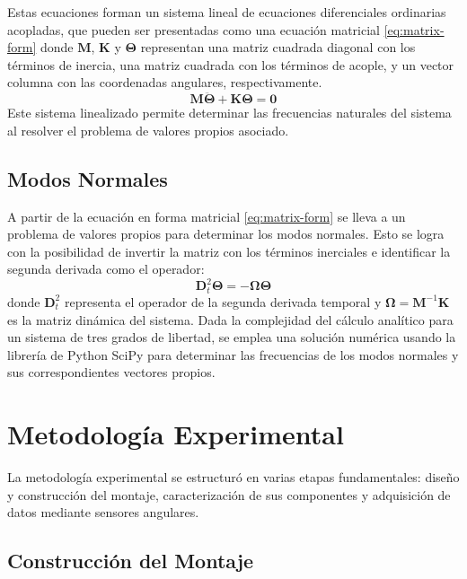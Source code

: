 Estas ecuaciones forman un sistema lineal de ecuaciones
diferenciales ordinarias acopladas, que pueden ser presentadas
como una ecuaci\'on matricial \cref{eq:matrix-form} donde
$\bm{M}$, $\bm{K}$ y $\bm{\Theta}$ representan una matriz cuadrada
diagonal con los t\'erminos de inercia, una matriz cuadrada con los
t\'erminos de acople, y un vector columna con las coordenadas
angulares, respectivamente.
\begin{equation}
  \mathbf{M} \ddot{\bm{\Theta}} + \mathbf{K} \bm{\Theta} = \mathbf{0}
  \label{eq:matrix-form}
\end{equation}
Este sistema linealizado permite determinar las frecuencias
naturales del sistema al resolver el problema de valores propios
asociado.

\subsection*{Modos Normales}

A partir de la ecuaci\'on en forma matricial \cref{eq:matrix-form} se
lleva a un problema de valores propios para determinar los modos
normales. Esto se logra con la posibilidad de invertir la matriz con
los t\'erminos inerciales e identificar la segunda derivada como el
operador:
\begin{equation}
  \mathbf{D}^2_t \bm{\Theta} = - \mathbf{\Omega} \bm{\Theta}
  \label{eq:eigenproblem}
\end{equation}
donde $\mathbf{D}^2_t$ representa el operador de la segunda derivada
temporal y $\mathbf{\Omega} = \mathbf{M}^{-1}\mathbf{K}$ es la matriz
din\'amica del sistema. Dada la complejidad del c\'alculo anal\'itico
para un sistema de tres grados de libertad, se emplea una soluci\'on
num\'erica usando la librer\'ia de Python SciPy para determinar
las frecuencias de los modos normales y sus correspondientes vectores
propios.

\section{Metodolog\'ia Experimental}

La metodolog\'ia experimental se estructur\'o en varias etapas
fundamentales: dise\~no y construcci\'on del montaje,
caracterizaci\'on de sus componentes y adquisici\'on de datos
mediante sensores angulares.

\subsection*{Construcci\'on del Montaje}

